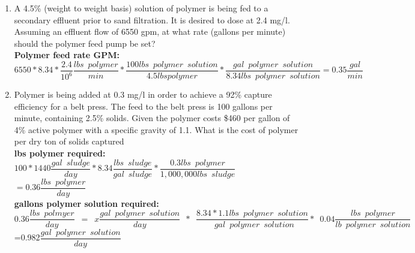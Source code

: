 \begin{enumerate}
\item A 4.5\% (weight to weight basis) solution of polymer is being fed to a secondary effluent prior to sand filtration. It is desired to dose at 2.4 mg/l. Assuming an effluent flow of 6550 gpm, at what rate (gallons per minute) should the polymer feed pump be set?\\
\vspace{0.25cm}
\textbf{Polymer feed rate GPM:}\\
\vspace{0.25cm}
$6550*8.34*\dfrac{2.4}{10^6}\dfrac{lbs \enspace polymer}{min}*
\dfrac{100lbs \enspace polymer \enspace solution}{4.5 lbs polymer}*
\dfrac{gal \enspace polymer \enspace solution}{8.34 lbs \enspace polymer \enspace solution}=\boxed{0.35\dfrac{gal}{min}}$
\pagebreak
\item Polymer is being added at 0.3 mg/l in order to achieve a 92\% capture efficiency for a belt press. The feed to the belt press is 100 gallons per minute, containing 2.5\% solids. Given the polymer costs \$460 per gallon of 4\% active polymer with a specific gravity of 1.1. What is the cost of polymer per dry ton of solids captured \\


\textbf{lbs polymer required:}\\
\vspace{0.25cm}
$100*1440 \dfrac{gal \enspace sludge}{day}* 8.34 \dfrac{lbs \enspace sludge}{gal \enspace sludge} *\dfrac{0.3lbs \enspace polymer}{1,000,000 lbs \enspace sludge}$\\
\vspace{0.25cm}
$= 0.36 \dfrac{lbs \enspace polymer}{day}$\\

\vspace{0.25cm}
\textbf{gallons polymer solution required:}\\
\vspace{0.25cm}
$0.36 \dfrac{lbs \enspace polmyer}{day}\enspace=\enspace x \dfrac{gal \enspace polymer \enspace solution}{day} \enspace * \enspace \dfrac{8.34*1.1lbs \enspace polymer \enspace solution}{\enspace gal \enspace polymer \enspace solution}* \enspace 0.04 \dfrac{lbs \enspace polymer}{lb \enspace polymer \enspace solution}$\\
\vspace{0.25cm}
=0.982$\dfrac{gal \enspace polymer \enspace solution}{day}$
\vspace{0.25cm}


\end{enumerate}

